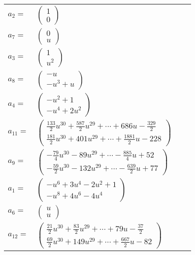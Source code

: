 \documentclass[1p]{elsarticle_modified}
\theoremstyle{definition}
\begin{document}
\begin{tabular}{m{7pt} m{180pt} m{7pt} m{180pt} }
\flushright $a_{2}=$&$\begin{pmatrix}1\\0\end{pmatrix}$ \\
\flushright $a_{7}=$&$\begin{pmatrix}0\\u\end{pmatrix}$ \\
\flushright $a_{3}=$&$\begin{pmatrix}1\\u^2\end{pmatrix}$ \\
\flushright $a_{8}=$&$\begin{pmatrix}- u\\- u^3+u\end{pmatrix}$ \\
\flushright $a_{4}=$&$\begin{pmatrix}- u^2+1\\- u^4+2 u^2\end{pmatrix}$ \\
\flushright $a_{11}=$&$\begin{pmatrix}\frac{133}{2} u^{30}+\frac{587}{2} u^{29}+\cdots+686 u-\frac{329}{2}\\\frac{181}{2} u^{30}+401 u^{29}+\cdots+\frac{1881}{2} u-228\end{pmatrix}$ \\
\flushright $a_{9}=$&$\begin{pmatrix}-\frac{79}{4} u^{30}-89 u^{29}+\cdots-\frac{885}{4} u+52\\-\frac{59}{2} u^{30}-132 u^{29}+\cdots-\frac{639}{2} u+77\end{pmatrix}$ \\
\flushright $a_{1}=$&$\begin{pmatrix}- u^6+3 u^4-2 u^2+1\\- u^8+4 u^6-4 u^4\end{pmatrix}$ \\
\flushright $a_{6}=$&$\begin{pmatrix}u\\u\end{pmatrix}$ \\
\flushright $a_{12}=$&$\begin{pmatrix}\frac{21}{2} u^{30}+\frac{83}{2} u^{29}+\cdots+79 u-\frac{37}{2}\\\frac{69}{2} u^{30}+149 u^{29}+\cdots+\frac{667}{2} u-82\end{pmatrix}$ \\

\end{tabular}
\end{document}
